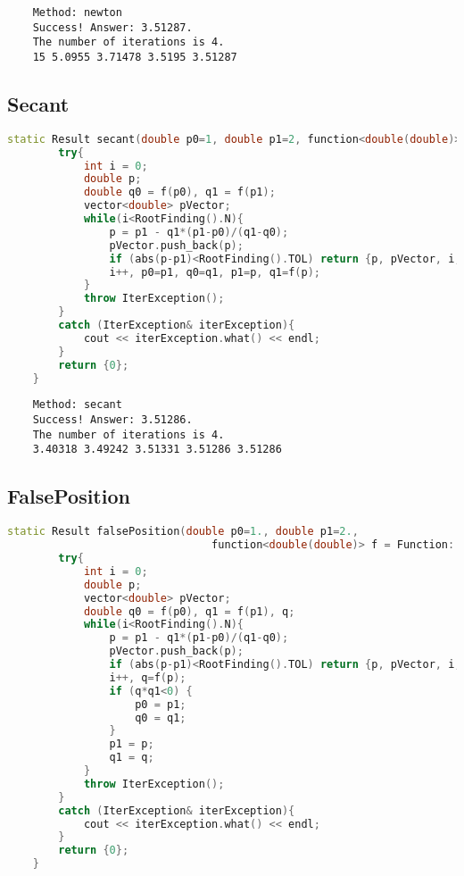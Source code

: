 \documentclass{article}
\begin{document}
\begin{lstlisting}
    Method: newton
    Success! Answer: 3.51287.
    The number of iterations is 4.
    15 5.0955 3.71478 3.5195 3.51287
\end{lstlisting}

\subsection{Secant}
\begin{lstlisting}[language=c++]
static Result secant(double p0=1, double p1=2, function<double(double)> f = Function::f){
        try{
            int i = 0;
            double p;
            double q0 = f(p0), q1 = f(p1);
            vector<double> pVector;
            while(i<RootFinding().N){
                p = p1 - q1*(p1-p0)/(q1-q0);
                pVector.push_back(p);
                if (abs(p-p1)<RootFinding().TOL) return {p, pVector, i, "secant"};
                i++, p0=p1, q0=q1, p1=p, q1=f(p);
            }
            throw IterException();
        }
        catch (IterException& iterException){
            cout << iterException.what() << endl;
        }
        return {0};
    }
\end{lstlisting}

\begin{lstlisting}
    Method: secant
    Success! Answer: 3.51286.
    The number of iterations is 4.
    3.40318 3.49242 3.51331 3.51286 3.51286
\end{lstlisting}

\subsection{FalsePosition}
\begin{lstlisting}[language=c++]
static Result falsePosition(double p0=1., double p1=2.,
                                function<double(double)> f = Function::f){
        try{
            int i = 0;
            double p;
            vector<double> pVector;
            double q0 = f(p0), q1 = f(p1), q;
            while(i<RootFinding().N){
                p = p1 - q1*(p1-p0)/(q1-q0);
                pVector.push_back(p);
                if (abs(p-p1)<RootFinding().TOL) return {p, pVector, i, "falsePosition"};
                i++, q=f(p);
                if (q*q1<0) {
                    p0 = p1;
                    q0 = q1;
                }
                p1 = p;
                q1 = q;
            }
            throw IterException();
        }
        catch (IterException& iterException){
            cout << iterException.what() << endl;
        }
        return {0};
    }
\end{lstlisting}
\end{document}
